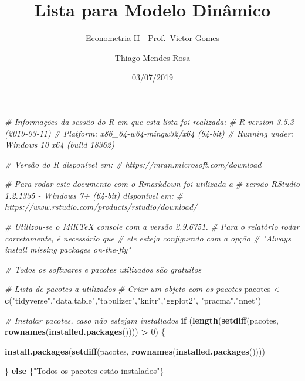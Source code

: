 \documentclass[12pt,a4paper]{article}
\title{Lista para Modelo Dinâmico}
\subtitle{Econometria II - Prof.~Victor Gomes}
\author{Thiago Mendes Rosa}
\date{03/07/2019}
\newenvironment{Shaded}{\begin{snugshade}}{\end{snugshade}}
\newcommand{\CommentTok}[1]{\textcolor[rgb]{0.56,0.35,0.01}{\textit{#1}}}
\newcommand{\ControlFlowTok}[1]{\textcolor[rgb]{0.13,0.29,0.53}{\textbf{#1}}}
\newcommand{\DecValTok}[1]{\textcolor[rgb]{0.00,0.00,0.81}{#1}}
\newcommand{\KeywordTok}[1]{\textcolor[rgb]{0.13,0.29,0.53}{\textbf{#1}}}
\newcommand{\NormalTok}[1]{#1}
\newcommand{\OperatorTok}[1]{\textcolor[rgb]{0.81,0.36,0.00}{\textbf{#1}}}
\newcommand{\StringTok}[1]{\textcolor[rgb]{0.31,0.60,0.02}{#1}}
\begin{document}
\maketitle

\begin{Shaded}
\begin{Highlighting}[]
\CommentTok{# Informações da sessão do R em que esta lista foi realizada:}
\CommentTok{# R version 3.5.3 (2019-03-11)}
\CommentTok{# Platform: x86_64-w64-mingw32/x64 (64-bit)}
\CommentTok{# Running under: Windows 10 x64 (build 18362)}

\CommentTok{# Versão do R disponível em:}
\CommentTok{# https://mran.microsoft.com/download}

\CommentTok{# Para rodar este documento com o Rmarkdown foi utilizada a}
\CommentTok{# versão RStudio 1.2.1335 - Windows 7+ (64-bit) disponível em:}
\CommentTok{# https://www.rstudio.com/products/rstudio/download/}

\CommentTok{# Utilizou-se o MiKTeX console com a versão 2.9.6751.}
\CommentTok{# Para o relatório rodar corretamente, é necessário que}
\CommentTok{# ele esteja configurado com a opção}
\CommentTok{# "Always install missing packages on-the-fly"}

\CommentTok{# Todos os softwares e pacotes utilizados são gratuítos}

\CommentTok{# Lista de pacotes a utilizados}
\CommentTok{# Criar um objeto com os pacotes}
\NormalTok{pacotes <-}\StringTok{ }\KeywordTok{c}\NormalTok{(}\StringTok{"tidyverse"}\NormalTok{,}\StringTok{"data.table"}\NormalTok{,}\StringTok{"tabulizer"}\NormalTok{,}\StringTok{"knitr"}\NormalTok{,}\StringTok{"ggplot2"}\NormalTok{,}
             \StringTok{"pracma"}\NormalTok{,}\StringTok{"nnet"}\NormalTok{)}

\CommentTok{# Instalar pacotes, caso não estejam installados}
\ControlFlowTok{if}\NormalTok{ (}\KeywordTok{length}\NormalTok{(}\KeywordTok{setdiff}\NormalTok{(pacotes, }\KeywordTok{rownames}\NormalTok{(}\KeywordTok{installed.packages}\NormalTok{()))) }\OperatorTok{>}\StringTok{ }\DecValTok{0}\NormalTok{) \{}
  
  \KeywordTok{install.packages}\NormalTok{(}\KeywordTok{setdiff}\NormalTok{(pacotes, }\KeywordTok{rownames}\NormalTok{(}\KeywordTok{installed.packages}\NormalTok{())))}

\NormalTok{\} }\ControlFlowTok{else}\NormalTok{ \{}\StringTok{"Todos os pacotes estão instalados"}\NormalTok{\}}
\end{Highlighting}
\end{Shaded}
\end{document}
